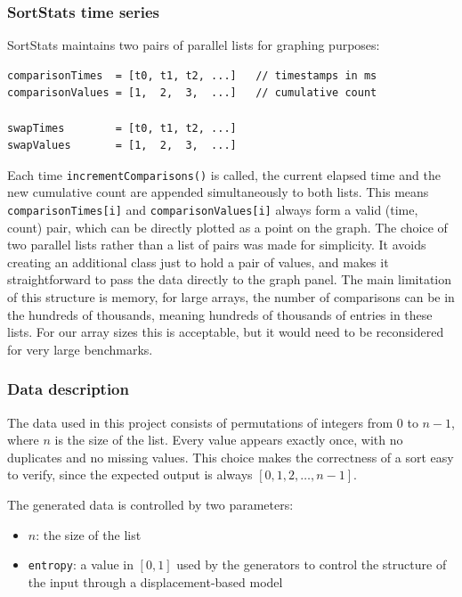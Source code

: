 \documentclass{article}
\begin{document}
\subsubsection{SortStats time series}

SortStats maintains two pairs of parallel lists for graphing purposes:

\begin{verbatim}
comparisonTimes  = [t0, t1, t2, ...]   // timestamps in ms
comparisonValues = [1,  2,  3,  ...]   // cumulative count

swapTimes        = [t0, t1, t2, ...]
swapValues       = [1,  2,  3,  ...]
\end{verbatim}

Each time \texttt{incrementComparisons()} is called, the current elapsed time and the new cumulative count are appended simultaneously to both lists. This means \texttt{comparisonTimes[i]} and \texttt{comparisonValues[i]} always form a valid (time, count) pair, which can be directly plotted as a point on the graph. The choice of two parallel lists rather than a list of pairs was made for simplicity. It avoids creating an additional class just to hold a pair of values, and makes it straightforward to pass the data directly to the graph panel. The main limitation of this structure is memory, for large arrays, the number of comparisons can be in the hundreds of thousands, meaning hundreds of thousands of entries in these lists. For our array sizes this is acceptable, but it would need to be reconsidered for very large benchmarks.

\subsubsection{Data description}

The data used in this project consists of permutations of integers from $0$ to $n-1$, where $n$ is the size of the list. Every value appears exactly once, with no duplicates and no missing values. This choice makes the correctness of a sort easy to verify, since the expected output is always $[0,1,2,\dots,n-1]$.

The generated data is controlled by two parameters:
\begin{itemize}
    \item $n$: the size of the list
    \item \texttt{entropy}: a value in $[0,1]$ used by the generators to control the structure of the input through a displacement-based model
\end{itemize}
\end{document}
